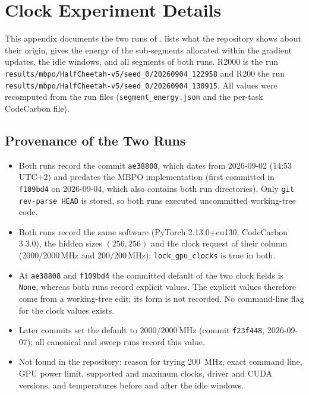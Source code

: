 \chapter{Clock Experiment Details}
\label{app:clock-details}

This appendix documents the two runs of .
 lists what the repository shows about their origin,  gives the energy of the sub-segments allocated within the gradient updates,  the idle windows, and  all segments of both runs.
R2000 is the run \texttt{results/mbpo/HalfCheetah-v5/seed\_0/20260904\_122958} and R200 the run \texttt{results/mbpo/HalfCheetah-v5/seed\_0/20260904\_130915}.
All values were recomputed from the run files (\texttt{segment\_energy.json} and the per-task CodeCarbon file).

\section{Provenance of the Two Runs}
\label{app:clock-provenance}

\begin{itemize}
  \item Both runs record the commit \texttt{ae38808}, which dates from 2026-09-02 (14:53 UTC+2) and predates the MBPO implementation (first committed in \texttt{f109bd4} on 2026-09-04, which also contains both run directories). Only \texttt{git rev-parse HEAD} is stored, so both runs executed uncommitted working-tree code.
  \item Both runs record the same software (PyTorch 2.13.0+cu130, CodeCarbon 3.3.0), the hidden sizes $(256,256)$ and the clock request of their column (\num{2000}/\num{2000}\,MHz and \num{200}/\num{200}\,MHz); \texttt{lock\_gpu\_clocks} is true in both.
  \item At \texttt{ae38808} and \texttt{f109bd4} the committed default of the two clock fields is \texttt{None}, whereas both runs record explicit values. The explicit values therefore come from a working-tree edit; its form is not recorded. No command-line flag for the clock values exists.
  \item Later commits set the default to $2000/2000$\,MHz (commit \texttt{f23f448}, 2026-09-07); all canonical and sweep runs record this value.
  \item Not found in the repository: reason for trying \SI{200}{\mega\hertz}, exact command line, GPU power limit, supported and maximum clocks, driver and CUDA versions, and temperatures before and after the idle windows.
\end{itemize}

